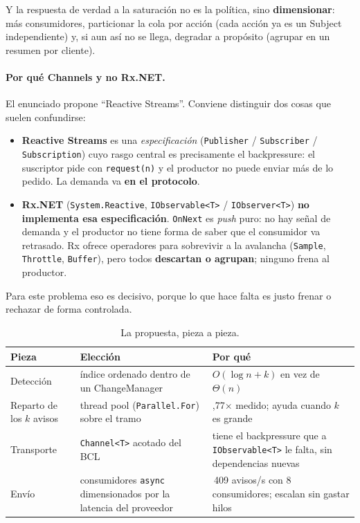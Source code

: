 Y la respuesta de verdad a la saturación no es la política, sino \textbf{dimensionar}: más
consumidores, particionar la cola por acción (cada acción ya es un Subject independiente) y,
si aun así no se llega, degradar a propósito (agrupar en un resumen por cliente).

\paragraph{Por qué Channels y no Rx.NET.}
El enunciado propone ``Reactive Streams''. Conviene distinguir dos cosas que suelen
confundirse:

\begin{itemize}
  \item \textbf{Reactive Streams} es una \emph{especificación} (\texttt{Publisher} /
        \texttt{Subscriber} / \texttt{Subscription}) cuyo rasgo central es precisamente el
        backpressure: el suscriptor pide con \texttt{request(n)} y el productor no puede
        enviar más de lo pedido. La demanda va \textbf{en el protocolo}.
  \item \textbf{Rx.NET} (\texttt{System.Reactive}, \texttt{IObservable<T>} /
        \texttt{IObserver<T>}) \textbf{no implementa esa especificación}. \texttt{OnNext} es
        \emph{push} puro: no hay señal de demanda y el productor no tiene forma de saber que
        el consumidor va retrasado. Rx ofrece operadores para sobrevivir a la avalancha
        (\texttt{Sample}, \texttt{Throttle}, \texttt{Buffer}), pero todos \textbf{descartan o
        agrupan}; ninguno frena al productor.
\end{itemize}

Para este problema eso es decisivo, porque lo que hace falta es justo frenar o rechazar de
forma controlada.

\begin{table}[H]
\centering
\small
\begin{tabularx}{\textwidth}{>{\raggedright\arraybackslash}p{3.4cm} >{\raggedright\arraybackslash}p{4.4cm} >{\raggedright\arraybackslash}X}
\toprule
\textbf{Pieza} & \textbf{Elección} & \textbf{Por qué} \\
\midrule
Detección & índice ordenado dentro de un ChangeManager & $O(\log n + k)$ en vez de $\Theta(n)$ \\
Reparto de los $k$ avisos & thread pool (\texttt{Parallel.For}) sobre el tramo & 1,77$\times$ medido; ayuda cuando $k$ es grande \\
Transporte & \texttt{Channel<T>} acotado del BCL & tiene el backpressure que a \texttt{IObservable<T>} le falta, sin dependencias nuevas \\
Envío & consumidores \texttt{async} dimensionados por la latencia del proveedor & 6\,409 avisos/s con 8 consumidores; escalan sin gastar hilos \\
\bottomrule
\end{tabularx}
\caption{La propuesta, pieza a pieza.}
\end{table}

